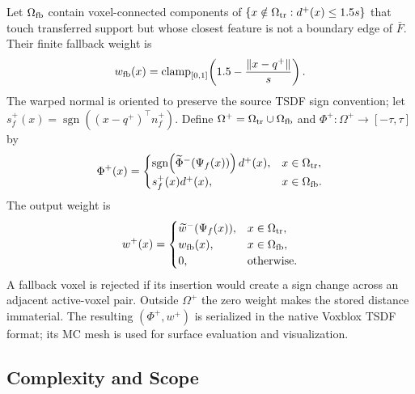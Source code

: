 Let $\Omega_{\rm fb}$ contain voxel-connected components of
$\{x\notin\Omega_{\rm tr}:d^+(x)\le1.5s\}$ that touch transferred support but
whose closest feature is not a boundary edge of $\bar F$. Their finite fallback
weight is
\begin{equation}
w_{\rm fb}(x)=\operatorname{clamp}_{[0,1]}\!\left(
1.5-\frac{\|x-q^+\|}{s}\right).
\label{eq:fallback_weight}
\end{equation}
The warped normal is oriented to preserve the source TSDF sign convention; let
$s_f^+(x)=\operatorname{sgn}((x-q^+)^\top n_f^+)$. Define
$\Omega^+=\Omega_{\rm tr}\cup\Omega_{\rm fb}$ and
$\Phi^+:\Omega^+\rightarrow[-\tau,\tau]$ by
\begin{equation}
\Phi^+(x)=
\begin{cases}
\operatorname{sgn}\!\left(\widetilde\Phi^-(\Psi_f(x))\right)d^+(x),
& x\in\Omega_{\rm tr},\\
s_f^+(x)d^+(x),
& x\in\Omega_{\rm fb}.
\end{cases}
\label{eq:hybrid_tsdf}
\end{equation}
The output weight is
\begin{equation}
w^+(x)=
\begin{cases}
\widetilde w^-(\Psi_f(x)), & x\in\Omega_{\rm tr},\\
w_{\rm fb}(x), & x\in\Omega_{\rm fb},\\
0, & \text{otherwise}.
\end{cases}
\label{eq:hybrid_weight}
\end{equation}
A fallback voxel is rejected if its insertion would create a sign change across
an adjacent active-voxel pair. Outside $\Omega^+$ the zero weight makes the
stored distance immaterial. The resulting
$(\Phi^+,w^+)$ is serialized in the native Voxblox TSDF format; its MC mesh is
used for surface evaluation and visualization.

\subsection{Complexity and Scope}

